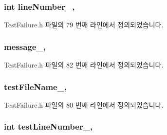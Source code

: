 \subsubsection[{\texorpdfstring{line\+Number\+\_\+}{lineNumber_}}]{\setlength{\rightskip}{0pt plus 5cm}int line\+Number\+\_\+\hspace{0.3cm}{\ttfamily [protected]}, {\ttfamily [inherited]}}\hypertarget{class_test_failure_ab83f5a7389dae9b8045aa6fbf55b153a}{}\label{class_test_failure_ab83f5a7389dae9b8045aa6fbf55b153a}


Test\+Failure.\+h 파일의 79 번째 라인에서 정의되었습니다.

\subsubsection[{\texorpdfstring{message\+\_\+}{message_}}]{ message\+\_\+\hspace{0.3cm}{\ttfamily [protected]}, {\ttfamily [inherited]}}\hypertarget{class_test_failure_af95aeab689fdb637c3e94b0c10db3e53}{}\label{class_test_failure_af95aeab689fdb637c3e94b0c10db3e53}


Test\+Failure.\+h 파일의 82 번째 라인에서 정의되었습니다.

\subsubsection[{\texorpdfstring{test\+File\+Name\+\_\+}{testFileName_}}]{ test\+File\+Name\+\_\+\hspace{0.3cm}{\ttfamily [protected]}, {\ttfamily [inherited]}}\hypertarget{class_test_failure_a19c231b59846532ec9d7ac8725886d67}{}\label{class_test_failure_a19c231b59846532ec9d7ac8725886d67}


Test\+Failure.\+h 파일의 80 번째 라인에서 정의되었습니다.

\subsubsection[{\texorpdfstring{test\+Line\+Number\+\_\+}{testLineNumber_}}]{\setlength{\rightskip}{0pt plus 5cm}int test\+Line\+Number\+\_\+\hspace{0.3cm}{\ttfamily [protected]}, {\ttfamily [inherited]}}\hypertarget{class_test_failure_abb1f7af8e12fc84b16898aa5b410ba2a}{}\label{class_test_failure_abb1f7af8e12fc84b16898aa5b410ba2a}


